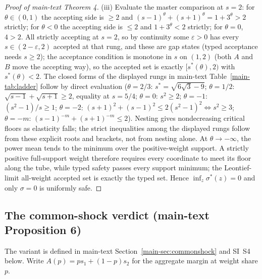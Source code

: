 \documentclass[preprint,11pt,authoryear]{elsarticle}
\theoremstyle{remark}
\begin{document}
\begin{proof}[Proof of main-text Theorem 4]
(iii) Evaluate the master comparison at $s=2$: for $\theta\in(0,1)$ the accepting side is $\ge2$ and $(s-1)^\theta+(s+1)^\theta=1+3^\theta>2$ strictly; for $\theta<0$ the accepting side is $\le2$ and $1+3^\theta<2$ strictly; for $\theta=0$, $4>2$. All strictly accepting at $s=2$, so by continuity some $\varepsilon>0$ has every $s\in(2-\varepsilon,2)$ accepted at that rung, and these are gap states (typed acceptance needs $s\ge2$); the acceptance condition is monotone in $s$ on $(1,2)$ (both $A$ and $B$ move the accepting way), so the accepted set is exactly $[s^*(\theta),2)$ with $s^*(\theta)<2$. The closed forms of the displayed rungs in main-text Table~\ref{main-tab:ladder} follow by direct evaluation ($\theta=2/3$: $s^*=\sqrt{6\sqrt3-9}$; $\theta=1/2$: $\sqrt{s-1}+\sqrt{s+1}\ge2$, equality at $s=5/4$; $\theta=0$: $s^2\ge2$; $\theta=-1$: $(s^2-1)/s\ge1$; $\theta=-2$: $(s+1)^2+(s-1)^2\le2(s^2-1)^2\iff s^2\ge3$; $\theta=-m$: $(s-1)^{-m}+(s+1)^{-m}\le2$). Nesting gives nondecreasing critical floors as elasticity falls; the strict inequalities among the displayed rungs follow from these explicit roots and brackets, not from nesting alone. At $\theta\to-\infty$, the power mean tends to the minimum over the positive-weight support. A strictly positive full-support weight therefore requires every coordinate to meet its floor along the tube, while typed safety passes every support minimum; the Leontief-limit all-weight accepted set is exactly the typed set. Hence $\inf_z\sigma^*(z)=0$ and only $\sigma=0$ is uniformly safe.
\end{proof}

\subsection{The common-shock verdict (main-text Proposition 6)}\label{si:csproofs}

The variant is defined in main-text Section~\ref{main-sec:commonshock} and SI~S4 below. Write $A(p)=ps_1+(1-p)s_2$ for the aggregate margin at weight share $p$.
\end{document}
